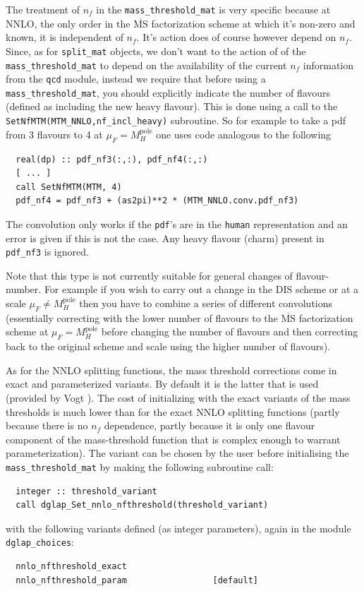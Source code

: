 \documentclass[12pt]{article}
\newcommand{\MSbar}{\overline{\mathrm{MS}}}
\newcommand{\ttt}[1]{\texttt{#1}}
\begin{document}
The treatment of $n_f$ in the \ttt{mass\_threshold\_mat} is very
specific because at NNLO, the only order in the $\MSbar$ factorization
scheme at which it's non-zero and known, it is independent of $n_f$.
It's action does of course however depend on $n_f$. Since, as for
\ttt{split\_mat} objects, we don't want to the action of of the
\ttt{mass\_threshold\_mat} to depend on the availability of the
current $n_f$ information from the \ttt{qcd} module, instead we
require that before using a \ttt{mass\_threshold\_mat}, you should
explicitly indicate the number of flavours (defined as including the
new heavy flavour). This is done using a call to the
\ttt{SetNfMTM(MTM\_NNLO,nf\_incl\_heavy)} subroutine. So for example
to take a pdf from 3 flavours to 4 at $\mu_F = M_H^\mathrm{pole}$ one
uses code analogous to the following
\begin{verbatim}
  real(dp) :: pdf_nf3(:,:), pdf_nf4(:,:)
  [ ... ]
  call SetNfMTM(MTM, 4)
  pdf_nf4 = pdf_nf3 + (as2pi)**2 * (MTM_NNLO.conv.pdf_nf3)
\end{verbatim}
The convolution only works if the \ttt{pdf}'s are in the \ttt{human}
representation and an error is given if this is not the case. Any
heavy flavour (charm) present in \ttt{pdf\_nf3} is ignored.

Note that this type is not currently suitable for general changes of
flavour-number. For example if you wish to carry out a change in the
DIS scheme or at a scale $\mu_F \neq M_H^\mathrm{pole}$ then you have
to combine a series of different convolutions (essentially correcting
with the lower number of flavours to the $\MSbar$ factorization scheme
at $\mu_F = M_H^\mathrm{pole}$ before changing the number of flavours
and then correcting back to the original scheme and scale using the
higher number of flavours).


As for the NNLO splitting functions, the mass threshold corrections
come in exact and parameterized variants. By default it is the latter
that is used (provided by Vogt \cite{VogtMTMParam}).  The cost of
initializing with the exact variants of the mass thresholds is much
lower than for the exact NNLO splitting functions (partly because
there is no $n_f$ dependence, partly because it is only one flavour
component of the mass-threshold function that is complex enough to
warrant parameterization). The variant can be chosen by the user
before initialising the \ttt{mass\_threshold\_mat} by making the
following subroutine call:
\begin{verbatim}
  integer :: threshold_variant
  call dglap_Set_nnlo_nfthreshold(threshold_variant)
\end{verbatim}
with the following variants defined (as integer parameters), again in
the module \ttt{dglap\_choices}:
\begin{verbatim}
  nnlo_nfthreshold_exact
  nnlo_nfthreshold_param                 [default]
\end{verbatim}
\end{document}

